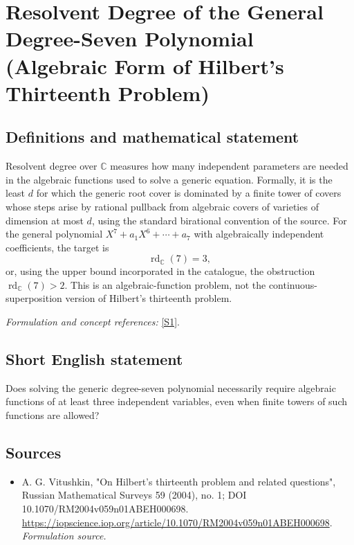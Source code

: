 \documentclass[11pt]{article}
\begin{document}
\section*{\texorpdfstring{Resolvent Degree of the General Degree-Seven Polynomial (Algebraic Form of Hilbert's Thirteenth Problem)}{Resolvent Degree of the General Degree-Seven Polynomial (Algebraic Form of Hilbert's Thirteenth Problem)}}\label{statement}
\subsection{Definitions and mathematical statement}
Resolvent degree over ${\mathbb{C}}$ measures how many independent parameters are needed in the algebraic functions used to solve a generic equation. Formally, it is the least $d$ for which the generic root cover is dominated by a finite tower of covers whose steps arise by rational pullback from algebraic covers of varieties of dimension at most $d$, using the standard birational convention of the source. For the general polynomial
$X^7+a_1X^6+\cdots+a_7$ with algebraically independent coefficients, the target is
\[
 \operatorname{rd}_{{\mathbb{C}}}(7)=3,
\]
or, using the upper bound incorporated in the catalogue, the obstruction $\operatorname{rd}_{{\mathbb{C}}}(7)>2$. This is an algebraic-function problem, not the continuous-superposition version of Hilbert's thirteenth problem.
\par\smallskip\textit{Formulation and concept references:} \href{https://iopscience.iop.org/article/10.1070/RM2004v059n01ABEH000698}{[S1]}.

\subsection{Short English statement}
Does solving the generic degree-seven polynomial necessarily require algebraic functions of at least three independent variables, even when finite towers of such functions are allowed?
\subsection{Sources}
\begin{itemize}
\item[S1]A. G. Vitushkin, "On Hilbert's thirteenth problem and related questions", Russian Mathematical Surveys 59 (2004), no. 1; DOI 10.1070/RM2004v059n01ABEH000698.
\url{https://iopscience.iop.org/article/10.1070/RM2004v059n01ABEH000698}.
\textit{Formulation source.}
\end{itemize}
\end{document}
